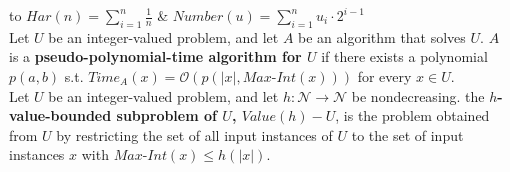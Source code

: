 \setlength{\tabcolsep}{6pt}
\begin{tabu} to \linewidth {X[-2.5,c]|X[c,m]}
  $\displaystyle Har(n) = \sum_{i=1}^n \frac1n$ & $\displaystyle Number(u) =
  \sum_{i=1}^n u_i \cdot 2^{i-1}$ \\ \hline
  {Let $U$ be an integer-valued problem, and let $A$ be an algorithm that solves
   $U$. $A$ is a {\bf pseudo-polynomial-time algorithm for $U$} if there exists
   a polynomial $p(a,b)$ s.t. $Time_A(x) = \mathcal{O}(p(|x|,
   Max\text{-}Int(x)))$ for every $x \in U$.} \\ \hline
  {Let $U$ be an integer-valued problem, and let $h : \mathcal{N} \rightarrow
   \mathcal{N}$ be nondecreasing. the {\bf $h$-value-bounded subproblem of $U$,
   $Value(h)-U$}, is the problem obtained from $U$ by restricting the set of all
   input instances of $U$ to the set of input instances $x$ with
   $Max\text{-}Int(x) \leq h(|x|)$.} \\ \hline
\end{tabu}
